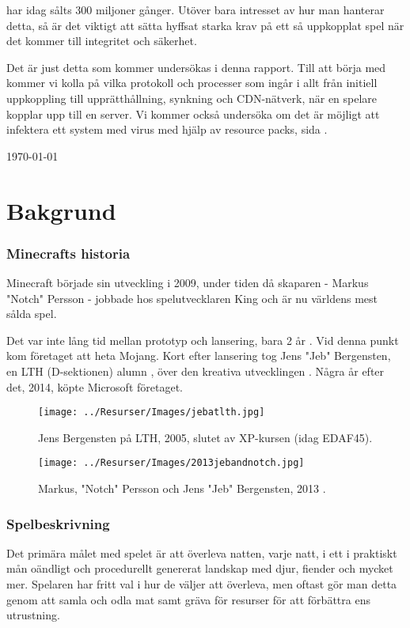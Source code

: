 \documentclass[journal,comsoc]{IEEEtran}
\begin{document}
 har idag sålts 300 miljoner gånger. \cite{statista:minecraftcopies} \cite{windowscentral:minecraft2023} Utöver bara intresset av hur man hanterar detta, så är det viktigt att sätta hyffsat starka krav på ett så uppkopplat spel när det kommer till integritet och säkerhet. 

Det är just detta som kommer undersökas i denna rapport. Till att börja med kommer vi kolla på vilka protokoll och processer som ingår i allt från initiell uppkoppling till upprätthållning, synkning och CDN-nätverk, när en spelare kopplar upp till en server. Vi kommer också undersöka om det är möjligt att infektera ett system med virus med hjälp av resource packs, sida \pageref{par:resourcepack}.
 
\hfill \today

\section{Bakgrund}
\subsubsection{Minecrafts historia}
Minecraft började sin utveckling i 2009, under tiden då skaparen - Markus "Notch" Persson - jobbade hos spelutvecklaren King \cite{wired:minecraft2014} och är nu världens mest sålda spel. \cite{windowscentral:minecraft2023}

Det var inte lång tid mellan prototyp och lansering, bara 2 år \cite{notch:tumblr:micdrop}. Vid denna punkt kom företaget att heta Mojang. Kort efter lansering tog Jens "Jeb" Bergensten, en LTH (D-sektionen) alumn \cite{linkedin:jeb}, över den kreativa utvecklingen \cite{notch:tumblr:micdrop}. Några år efter det, 2014, köpte Microsoft företaget. \cite{microsoft:minecraft2014}

\begin{figure}
  \centering
  \texttt{[image: ../Resurser/Images/jebatlth.jpg]}
  \caption{Jens Bergensten på LTH, 2005, slutet av XP-kursen (idag EDAF45). \cite{dsek:jensbergensten}}
  \label{fig:JebLTH}
  \vspace*{1em}
  \texttt{[image: ../Resurser/Images/2013jebandnotch.jpg]}
  \caption{Markus, "Notch" Persson och Jens "Jeb" Bergensten, 2013 \cite{time:minecraft2013}.}
  \label{fig:Notch}
\end{figure}
\subsubsection{Spelbeskrivning}
Det primära målet med spelet är att överleva natten, varje natt, i ett i praktiskt mån oändligt och procedurellt genererat landskap med djur, fiender och mycket mer. Spelaren har fritt val i hur de väljer att överleva, men oftast gör man detta genom att samla och odla mat samt gräva för resurser för att förbättra ens utrustning.
\end{document}
